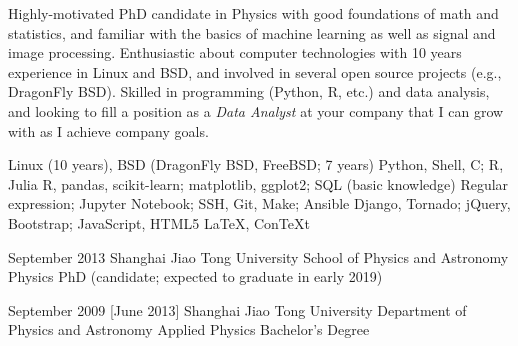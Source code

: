\documentclass{resume}
\newcommand{\myposition}{Data Analyst}
\begin{document}
\makeheader

Highly-motivated PhD candidate in Physics with good foundations of math
and statistics, and familiar with the basics of machine learning as well
as signal and image processing.
Enthusiastic about computer technologies with 10 years experience
in Linux and BSD, and involved in several open source projects (e.g.,
DragonFly BSD).
Skilled in programming (Python, R, etc.) and data analysis,
and looking to fill a position as a \emph{\myposition} at your company
that I can grow with as I achieve company goals.

\begin{competences}[10em]
    {Linux (10 years), BSD (DragonFly BSD, FreeBSD; 7 years)}
    {Python, Shell, C; R, Julia}
    {R, pandas, scikit-learn; matplotlib, ggplot2; SQL (basic knowledge)}
    {Regular expression; Jupyter Notebook; SSH, Git, Make; Ansible}
    {Django, Tornado; jQuery, Bootstrap; JavaScript, HTML5}
    {\LaTeX, Con\TeX{}t}
\end{competences}

\begin{educations}
  \education%
    {September 2013}%
    {Shanghai Jiao Tong University}%
    {School of Physics and Astronomy}%
    {Physics}%
    {PhD (candidate; expected to graduate in early 2019)}

  \separator{0.7em}
  \education%
    {September 2009}%
    [June 2013]%
    {Shanghai Jiao Tong University}%
    {Department of Physics and Astronomy}%
    {Applied Physics}%
    {Bachelor's Degree}
\end{educations}
\end{document}
